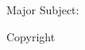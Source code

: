 \begin{titlepage}
\begin{tabular}{ll}
\end{tabular}

\vspace{3em}

\begin{center}
\tamugradmonth \hspace{2pt} \tamugradyear

\vspace{3em}

Major Subject: \tamudepartment \par
\vspace{3em}
Copyright \tamugradyear \hspace{.5em}\tamufullname 
\par\end{center}
\end{titlepage}
\pagebreak{}




